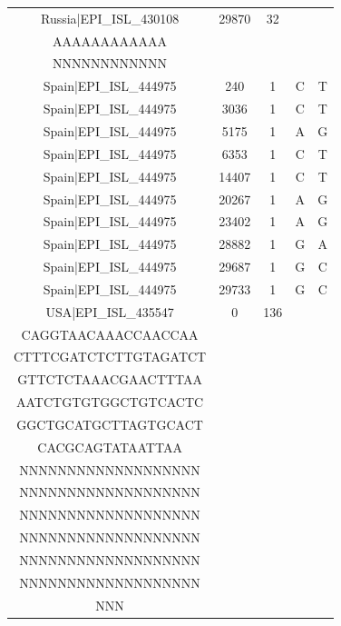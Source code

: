 \documentclass[a4paper,10pt]{article}
\begin{document}
\begin{longtable}{@{}ccccc@{}}
Russia|EPI\_ISL\_430108 & 29870 & 32 & \begin{tabular}[c]{@{}c@{}}AAAAAAAAAAAAAAAAAAAA\\ AAAAAAAAAAAA\end{tabular} & \begin{tabular}[c]{@{}c@{}}NNNNNNNNNNNNNNNNNNNN\\ NNNNNNNNNNNN\end{tabular} \\* \midrule
Spain|EPI\_ISL\_444975 & 240 & 1 & C & T \\* \midrule
Spain|EPI\_ISL\_444975 & 3036 & 1 & C & T \\* \midrule
Spain|EPI\_ISL\_444975 & 5175 & 1 & A & G \\* \midrule
Spain|EPI\_ISL\_444975 & 6353 & 1 & C & T \\* \midrule
Spain|EPI\_ISL\_444975 & 14407 & 1 & C & T \\* \midrule
Spain|EPI\_ISL\_444975 & 20267 & 1 & A & G \\* \midrule
Spain|EPI\_ISL\_444975 & 23402 & 1 & A & G \\* \midrule
Spain|EPI\_ISL\_444975 & 28882 & 1 & G & A \\* \midrule
Spain|EPI\_ISL\_444975 & 29687 & 1 & G & C \\* \midrule
Spain|EPI\_ISL\_444975 & 29733 & 1 & G & C \\* \midrule
USA|EPI\_ISL\_435547 & 0 & 136 & \begin{tabular}[c]{@{}c@{}}ATTAAAGGTTTATACCTTCC\\ CAGGTAACAAACCAACCAA\\ CTTTCGATCTCTTGTAGATCT\\ GTTCTCTAAACGAACTTTAA\\ AATCTGTGTGGCTGTCACTC\\ GGCTGCATGCTTAGTGCACT\\ CACGCAGTATAATTAA\end{tabular} & \begin{tabular}[c]{@{}c@{}}NNNNNNNNNNNNNNNNNNN\\ NNNNNNNNNNNNNNNNNNN\\ NNNNNNNNNNNNNNNNNNN\\ NNNNNNNNNNNNNNNNNNN\\ NNNNNNNNNNNNNNNNNNN\\ NNNNNNNNNNNNNNNNNNN\\ NNNNNNNNNNNNNNNNNNN\\ NNN\end{tabular} \\* \midrule

\end{longtable}
\end{document}

